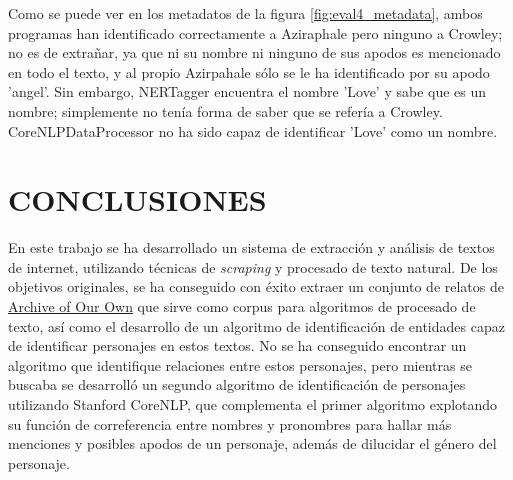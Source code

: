 \documentclass{pre-tfg}
\begin{document}
Como se puede ver en los metadatos de la figura \ref{fig:eval4_metadata}, ambos programas han identificado correctamente a Aziraphale pero ninguno a Crowley; no es de extrañar, ya que ni su nombre ni ninguno de sus apodos es mencionado en todo el texto, y al propio Azirpahale sólo se le ha identificado por su apodo 'angel'. Sin embargo, NERTagger encuentra el nombre 'Love' y sabe que es un nombre; simplemente no tenía forma de saber que se refería a Crowley. CoreNLPDataProcessor no ha sido capaz de identificar 'Love' como un nombre.


\cleardoublepage

\section{CONCLUSIONES}
En este trabajo se ha desarrollado un sistema de extracción y análisis de textos de internet, utilizando técnicas de \textit{scraping} y procesado de texto natural. De los objetivos originales, se ha conseguido con éxito extraer un conjunto de relatos de \href{http://wwww.archiveofourown.org}{Archive of Our Own} que sirve como corpus para algoritmos de procesado de texto, así como el desarrollo de un algoritmo de identificación de entidades capaz de identificar personajes en estos textos. No se ha conseguido encontrar un algoritmo que identifique relaciones entre estos personajes, pero mientras se buscaba se desarrolló un segundo algoritmo de identificación de personajes utilizando Stanford CoreNLP, que complementa el primer algoritmo explotando su función de correferencia entre nombres y pronombres para hallar más menciones y posibles apodos de un personaje, además de dilucidar el género del personaje.

\end{document}
